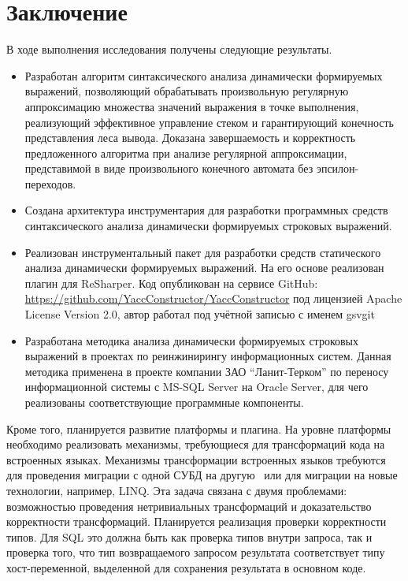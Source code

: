 \chapter*{Заключение}						%

В ходе выполнения исследования получены следующие результаты.

\begin{itemize}

\item Разработан алгоритм синтаксического анализа динамически формируемых выражений, позволяющий обрабатывать произвольную регулярную аппроксимацию множества значений выражения в точке выполнения, реализующий эффективное управление стеком и гарантирующий конечность представления леса вывода. Доказана завершаемость и корректность предложенного алгоритма при анализе регулярной аппроксимации, представимой в виде произвольного конечного автомата без эпсилон-переходов.

\item Создана архитектура инструментария для разработки программных средств синтаксического анализа динамически формируемых строковых выражений.

\item Реализован инструментальный пакет для разработки средств статического анализа динамически формируемых выражений. На его основе реализован плагин для ReSharper. Код опубликован на сервисе GitHub: \\ \url{https://github.com/YaccConstructor/YaccConstructor} под лицензией Apache License Version 2.0, автор работал под учётной записью с именем gsvgit

\item Разработана методика анализа динамически формируемых строковых выражений в проектах по реинжинирингу информационных систем. Данная методика применена в проекте компании ЗАО ``Ланит-Терком'' по переносу информационной системы с MS-SQL Server на Oracle Server, для чего реализованы соответствующие программные компоненты.

\end{itemize}

Кроме того, планируется развитие платформы и плагина. На уровне платформы необходимо реализовать механизмы, требующиеся для трансформаций кода на встроенных языках. Механизмы трансформации встроенных языков требуются для проведения миграции с одной СУБД на другую~\cite{Syrcose} или для миграции на новые технологии, например, LINQ. Эта задача связана с двумя проблемами: возможностью проведения нетривиальных трансформаций и доказательство корректности трансформаций. Планируется реализация проверки корректности типов. Для SQL это должна быть как проверка типов внутри запроса, так и проверка того, что тип возвращаемого запросом результата соответствует типу хост-переменной, выделенной для сохранения результата в основном коде.

